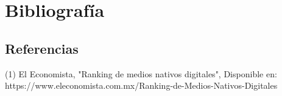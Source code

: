 

\chapter{Bibliografía}\label{chp:introduccion}

\section{Referencias}

(1) El Economista, "Ranking de medios nativos digitales", Disponible en: https://www.eleconomista.com.mx/Ranking-de-Medios-Nativos-Digitales

